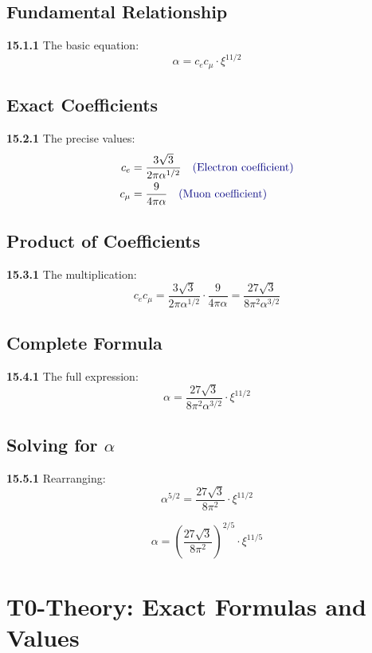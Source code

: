 \documentclass[12pt,a4paper]{article}
\begin{document}
\subsection{Fundamental Relationship}

\noindent \textbf{15.1.1} The basic equation:
\[
\boxed{\alpha = c_e c_\mu \cdot \xi^{11/2}}
\]

\subsection{Exact Coefficients}

\noindent \textbf{15.2.1} The precise values:
\begin{align*}
	c_e &= \frac{3\sqrt{3}}{2\pi\alpha^{1/2}} \quad \textcolor{deepblue}{\text{(Electron coefficient)}} \\
	c_\mu &= \frac{9}{4\pi\alpha} \quad \textcolor{deepblue}{\text{(Muon coefficient)}}
\end{align*}

\subsection{Product of Coefficients}

\noindent \textbf{15.3.1} The multiplication:
\[
c_e c_\mu = \frac{3\sqrt{3}}{2\pi\alpha^{1/2}} \cdot \frac{9}{4\pi\alpha} = \frac{27\sqrt{3}}{8\pi^2\alpha^{3/2}}
\]

\subsection{Complete Formula}

\noindent \textbf{15.4.1} The full expression:
\[
\alpha = \frac{27\sqrt{3}}{8\pi^2\alpha^{3/2}} \cdot \xi^{11/2}
\]

\subsection{Solving for $\alpha$}

\noindent \textbf{15.5.1} Rearranging:
\[
\alpha^{5/2} = \frac{27\sqrt{3}}{8\pi^2} \cdot \xi^{11/2}
\]

\[
\alpha = \left(\frac{27\sqrt{3}}{8\pi^2}\right)^{2/5} \cdot \xi^{11/5}
\]


\section{T0-Theory: Exact Formulas and Values}
\end{document}
